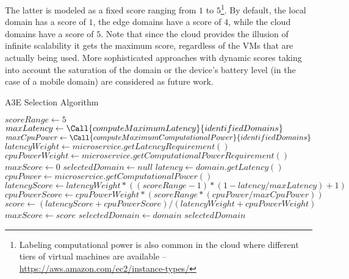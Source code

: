 The latter is modeled as a fixed score ranging from $1$ to $5$\footnote{Labeling computational power is also common in the cloud where different tiers of virtual machines are available -- \url{https://aws.amazon.com/ec2/instance-types/}}. By default, the local domain has a score of $1$, the edge domains have a score of $4$, while the cloud domains have a score of $5$. Note that since the cloud provides the illusion of infinite scalability it gets the maximum score, regardless of the VMs that are actually being used. More sophisticated approaches with dynamic scores taking into account the saturation of the domain or the device's battery level (in the case of a mobile domain) are considered as future work.

\begin{algorithm}[thb]
	\caption{A3E Selection Algorithm}
	\label{alg:selection}
	\begin{algorithmic}[1]
		
		\State$scoreRange \gets 5$
		\State $maxLatency \gets \Call{computeMaximumLatency}{identifiedDomains}$
		\State $maxCpuPower \gets \Call{computeMaximumComputationalPower}{identifiedDomains}$
		\State $latencyWeight \gets microservice.getLatencyRequirement()$ 
		\State $cpuPowerWeight \gets microservice.getComputationalPowerRequirement()$ 
		\State $maxScore \gets 0$
		\State $selectedDomain \gets null$
		\State $latency \gets domain.getLatency()$ 
		\State $cpuPower \gets microservice.getComputationalPower()$ 
		\State $latencyScore \gets latencyWeight*((scoreRange-1)*(1 - latency/maxLatency)+1)$ 
		\State $cpuPowerScore \gets cpuPowerWeight*(scoreRange*(cpuPower/maxCpuPower))$
		\State $score \gets (latencyScore + cpuPowerScore) / (latencyWeight + cpuPowerWeight)$
		\State $maxScore \gets score$
		\State $selectedDomain \gets domain$
		\EndIf
		\EndFor 
		\State \Return $selectedDomain$
		\EndFunction
	\end{algorithmic}
\end{algorithm}



